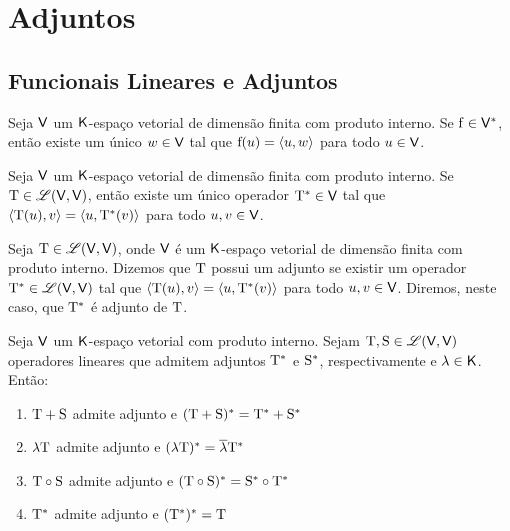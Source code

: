 \documentclass[10pt,a4paper]{book}
\begin{document}
\chapter{Adjuntos}




\section{Funcionais Lineares e Adjuntos}

\begin{proposition}
	Seja $\mathsf{ V }$ um $\mathsf{ K }$-espaço vetorial de dimensão finita com produto interno. Se $\mathrm{ f } \in \mathsf{ V } ^ *$, então existe um único $w \in \mathsf{ V }$ tal que $\mathrm{ f }(u) = \langle u, w \rangle$ para todo $u \in \mathsf{ V }$.
\end{proposition}

\begin{theorem}
	Seja $\mathsf{ V }$ um $\mathsf{ K }$-espaço vetorial de dimensão finita com produto interno. Se $\mathrm{ T } \in \mathscr{ L }(\mathsf{ V }, \mathsf{ V })$, então existe um único operador $\mathrm{ T ^ *} \in \mathsf{ V }$ tal que $\langle \mathrm{ T }(u), v \rangle = \langle u, \mathrm{ T ^ *}(v) \rangle$ para todo $u, v \in \mathsf{ V }$.
\end{theorem}

\begin{definition}
	Seja $\mathrm{ T } \in \mathscr{ L }(\mathsf{ V }, \mathsf{ V })$, onde $\mathsf{ V }$ é um $\mathsf{ K }$-espaço vetorial de dimensão finita com produto interno. Dizemos que $\mathrm{ T }$ possui um adjunto se existir um operador $\mathrm{ T ^ *} \in \mathscr{ L }(\mathsf{ V }, \mathsf{ V })$ tal que $\langle \mathrm{ T }(u), v \rangle = \langle u, \mathrm{ T ^ *}(v) \rangle$ para todo $u, v \in \mathsf{ V }$. Diremos, neste caso, que $\mathrm{ T ^ *}$ é adjunto de $\mathrm{ T }$.
\end{definition}

\begin{proposition}
	Seja $\mathsf{ V }$ um $\mathsf{ K }$-espaço vetorial com produto interno. Sejam $\mathrm{ T }, \mathrm{ S } \in \mathscr{ L }(\mathsf{ V }, \mathsf{ V })$ operadores lineares que admitem adjuntos $\mathrm{ T ^ *}$ e $\mathrm{ S ^ *}$, respectivamente e $\lambda \in \mathsf{ K }$. Então:
	\begin{enumerate}
		\item $\mathrm{ T } + \mathrm{ S }$ admite adjunto e $(\mathrm{ T } + \mathrm{ S }) ^ * = \mathrm{ T ^ *} + \mathrm{ S ^ *}$
		\item $\lambda \mathrm{ T }$ admite adjunto e $(\lambda \mathrm{ T }) ^ * = \overline{\lambda} \mathrm{ T ^ *}$
		\item $\mathrm{ T } \circ \mathrm{ S }$ admite adjunto e $(\mathrm{ T } \circ \mathrm{ S }) ^ * = \mathrm{ S ^ *} \circ \mathrm{ T ^ *}$
		\item $\mathrm{ T ^ *}$ admite adjunto e $(\mathrm{ T ^ *}) ^ * = \mathrm{ T }$
	\end{enumerate}
\end{proposition}
\end{document}
